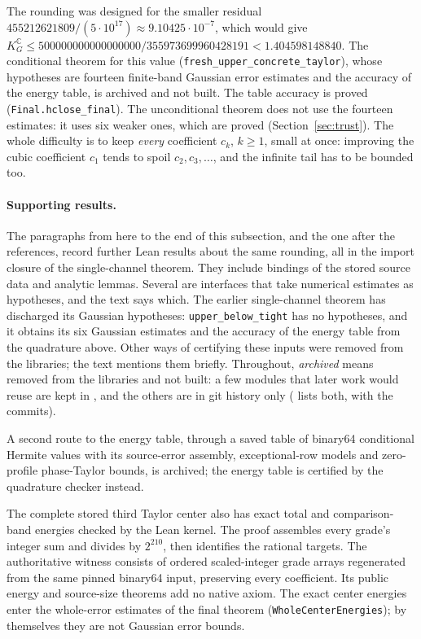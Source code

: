 \documentclass[11pt,a4paper]{article}
\newcommand{\C}{\mathbb{C}}
\newcommand{\KG}{K_G^{\C}}
\newcommand{\lean}[1]{\texttt{\small #1}}
\begin{document}
The rounding was designed for the smaller residual $455212621809/(5\cdot10^{17})\approx9.10425\cdot10^{-7}$, which
would give $\KG\le500000000000000000/355973699960428191<1.404598148840$. The conditional theorem for this
value (\lean{fresh\_upper\_concrete\_taylor}), whose hypotheses are fourteen finite-band Gaussian error estimates
and the accuracy of the energy table, is archived and not built. The table accuracy is proved
(\lean{Final.hclose\_final}). The unconditional theorem does not use the fourteen estimates: it uses six weaker
ones, which are proved (Section~\ref{sec:trust}).
The whole difficulty is to keep \emph{every} coefficient $c_k$, $k\ge1$, small at once: improving the cubic coefficient
$c_1$ tends to spoil $c_2,c_3,\dots$, and the infinite tail has to be bounded too.

\paragraph{Supporting results.}
The paragraphs from here to the end of this subsection, and the one after the
references, record further Lean results about the same rounding, all in the
import closure of the single-channel theorem. They include bindings of the stored source data and
analytic lemmas. Several are
interfaces that take numerical estimates as hypotheses, and the text says which.
The earlier single-channel theorem has discharged its Gaussian hypotheses: \lean{upper\_below\_tight}
has no hypotheses, and it obtains its six Gaussian estimates and the accuracy of
the energy table from the quadrature above. Other ways of certifying these inputs
were removed from the libraries; the text mentions them briefly. Throughout,
\emph{archived} means removed from the libraries and not built: a few modules that
later work would reuse are kept in , and the others are in git
history only ( lists both, with the commits).

A second route to the energy table, through a saved table of binary64
conditional Hermite values with its source-error assembly, exceptional-row
models and zero-profile phase-Taylor bounds, is archived; the energy table is
certified by the quadrature checker instead.

The complete stored third Taylor center also has exact total and
comparison-band energies checked by the Lean kernel. The proof assembles every
grade's integer sum and divides by $2^{210}$, then identifies the rational
targets. The authoritative witness consists of ordered scaled-integer grade
arrays regenerated from the same pinned binary64 input, preserving every
coefficient. Its public energy and source-size theorems add no native axiom.
The exact center energies enter the whole-error estimates of the final theorem
(\lean{WholeCenterEnergies}); by themselves they are not Gaussian error bounds.
\end{document}
